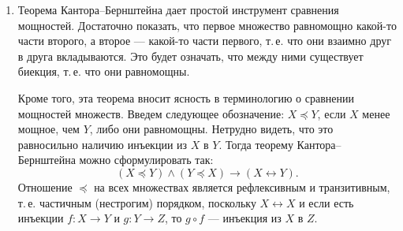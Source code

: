 \begin{enumerate}

\item Теорема Кантора--Бернштейна дает простой инструмент сравнения мощностей. Достаточно показать, что первое множество равномощно какой-то части второго, а второе --- какой-то части первого, т.\,е. что они взаимно друг в друга вкладываются. Это будет означать, что между ними существует биекция, т.\,е. что они равномощны.

Кроме того, эта теорема вносит ясность в терминологию о сравнении мощностей множеств. Введем следующее обозначение: $X\preccurlyeq Y$, если $X$ менее мощное, чем $Y$, либо они равномощны. Нетрудно видеть, что это равносильно наличию инъекции из $X$ в $Y$. Тогда теорему Кантора--Бернштейна можно сформулировать так:
$$
(X\preccurlyeq Y)\land(Y\preccurlyeq X)\to (X\leftrightarrow Y).
$$
Отношение $\preccurlyeq$ на всех множествах является рефлексивным и транзитивным, т.\,е. частичным (нестрогим) порядком, поскольку $X\leftrightarrow X$ и если есть инъекции $f:X\to Y$ и $g:Y\to Z$, то $g\circ f$ --- инъекция из $X$ в $Z$.


\end{enumerate}
